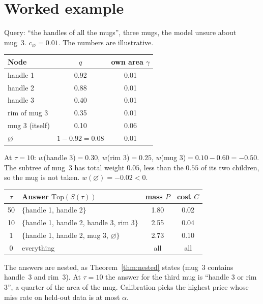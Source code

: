 \documentclass[11pt,a4paper]{article}
\theoremstyle{definition}
\theoremstyle{remark}
\newcommand{\nul}{\varnothing}
\newcommand{\Top}{\mathrm{Top}}
\begin{document}
\section{Worked example}
Query: ``the handles of all the mugs'', three mugs, the model unsure about mug~3. $c_\nul=0.01$. The numbers are
illustrative.
\begin{center}
\begin{tabular}{lcc}
\toprule
Node & $q$ & own area $\gamma$ \\
\midrule
handle 1 & 0.92 & 0.01 \\
handle 2 & 0.88 & 0.01 \\
handle 3 & 0.40 & 0.01 \\
rim of mug 3 & 0.35 & 0.01 \\
mug 3 (itself) & 0.10 & 0.06 \\
$\nul$ & $1-0.92=0.08$ & 0.01 \\
\bottomrule
\end{tabular}
\end{center}
At $\tau=10$: $w$(handle 3)$=0.30$, $w$(rim 3)$=0.25$, $w$(mug 3)$=0.10-0.60=-0.50$. The subtree of mug~3 has total
weight $0.05$, less than the $0.55$ of its two children, so the mug is not taken. $w(\nul)=-0.02<0$.
\begin{center}
\begin{tabular}{clcc}
\toprule
$\tau$ & Answer $\Top(S(\tau))$ & mass $P$ & cost $C$ \\
\midrule
50 & $\{$handle 1, handle 2$\}$ & 1.80 & 0.02 \\
10 & $\{$handle 1, handle 2, handle 3, rim 3$\}$ & 2.55 & 0.04 \\
1 & $\{$handle 1, handle 2, mug 3, $\nul\}$ & 2.73 & 0.10 \\
0 & everything & all & all \\
\bottomrule
\end{tabular}
\end{center}
The answers are nested, as Theorem~\ref{thm:nested} states (mug~3 contains handle~3 and rim~3). At $\tau=10$ the
answer for the third mug is ``handle 3 or rim 3'', a quarter of the area of the mug. Calibration picks the highest
price whose miss rate on held-out data is at most $\alpha$.

\end{document}
